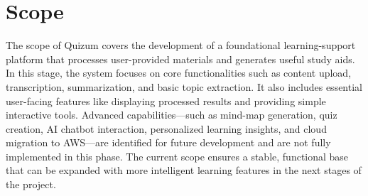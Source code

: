 \section{Scope}
The scope of Quizum covers the development of a foundational learning-support platform that processes user-provided materials and generates useful study aids. In this stage, the system focuses on core functionalities such as content upload, transcription, summarization, and basic topic extraction. It also includes essential user-facing features like displaying processed results and providing simple interactive tools. Advanced capabilities—such as mind-map generation, quiz creation, AI chatbot interaction, personalized learning insights, and cloud migration to AWS—are identified for future development and are not fully implemented in this phase. The current scope ensures a stable, functional base that can be expanded with more intelligent learning features in the next stages of the project.